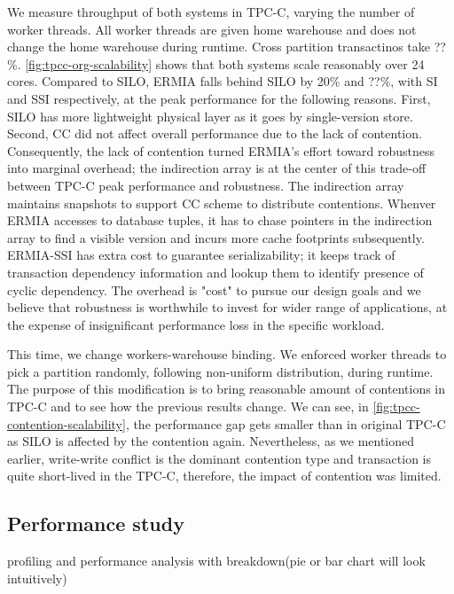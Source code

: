 We measure throughput of both systems in TPC-C, varying the number of worker threads. All worker threads are given home warehouse and does not change the home warehouse during runtime. Cross partition transactinos take ??\%. \ref{fig:tpcc-org-scalability} shows that both systems scale reasonably over 24 cores. Compared to SILO, ERMIA falls behind SILO by 20\% and ??\%, with SI and SSI respectively, at the peak performance for the following reasons. First, SILO has more lightweight physical layer as it goes by single-version store. Second, CC did not affect overall performance due to the lack of contention. Consequently, the lack of contention turned ERMIA's effort toward robustness into marginal overhead; the indirection array is at the center of this trade-off between TPC-C peak performance and robustness. The indirection array maintains snapshots to support CC scheme to distribute contentions. Whenver ERMIA accesses to database tuples, it has to chase pointers in the indirection array to find a visible version and incurs more cache footprints subsequently. ERMIA-SSI has extra cost to guarantee serializability; it keeps track of transaction dependency information and lookup them to identify presence of cyclic dependency. The overhead is "cost" to pursue our design goals and we believe that robustness is worthwhile to invest for wider range of applications, at the expense of insignificant performance loss in the specific workload.

This time, we change workers-warehouse binding. We enforced worker threads to pick a partition randomly, following non-uniform distribution, during runtime. The purpose of this modification is to bring reasonable amount of contentions in TPC-C and to see how the previous results change. We can see, in \ref{fig:tpcc-contention-scalability}, the performance gap gets smaller than in original TPC-C as SILO is affected by the contention again. Nevertheless, as we mentioned earlier, write-write conflict is the dominant contention type and transaction is quite short-lived in the TPC-C, therefore, the impact of contention was limited.  %

\subsection{Performance study}

profiling and performance analysis with breakdown(pie or bar chart will look intuitively)

